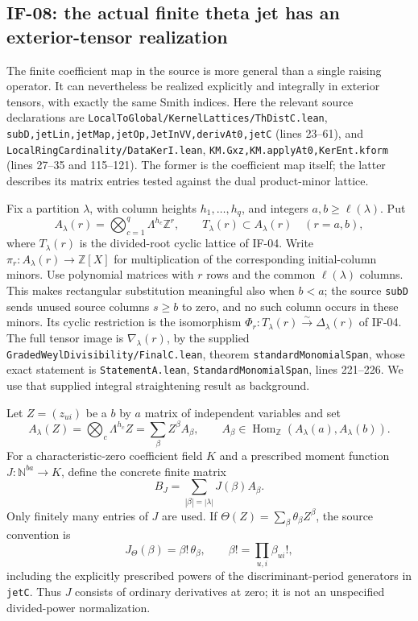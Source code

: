 \subsection{IF-08: the actual finite theta jet has an exterior-tensor realization}
The finite coefficient map in the source is more general than a single
raising operator. It can nevertheless be realized explicitly and
integrally in exterior tensors, with exactly the same Smith indices.
Here the relevant source declarations are
\texttt{LocalToGlobal/KernelLattices/ThDistC.lean},
\texttt{subD,jetLin,jetMap,jetOp,JetInVV,derivAt0,jetC}
(lines 23--61), and
\texttt{LocalRingCardinality/DataKerI.lean},
\texttt{KM.Gxz,KM.applyAt0,KerEnt.kform} (lines 27--35 and 115--121).
The former is the coefficient map itself; the latter describes its
matrix entries tested against the dual product-minor lattice.

Fix a partition $\lambda$, with column heights $h_1,\ldots,h_q$,
and integers $a,b\geq\ell(\lambda)$. Put
\[
 A_\lambda(r)=\bigotimes_{c=1}^q\Lambda^{h_c}\mathbb Z^r,
 \qquad T_\lambda(r)\subset A_\lambda(r)
 \quad (r=a,b),
\]
where $T_\lambda(r)$ is the divided-root cyclic lattice of IF-04.
Write $\pi_r:A_\lambda(r)\longrightarrow\mathbb Z[X]$ for
multiplication of the corresponding initial-column minors. Use polynomial
matrices with $r$ rows and the common $\ell(\lambda)$ columns. This
makes rectangular substitution meaningful also when $b<a$; the
source \texttt{subD} sends unused source columns $s\geq b$ to zero,
and no such column occurs in these minors. Its cyclic
restriction is the isomorphism
$\Phi_r:T_\lambda(r)\xrightarrow\sim\Delta_\lambda(r)$ of IF-04.
The full tensor image is $\nabla_\lambda(r)$, by the supplied
\texttt{GradedWeylDivisibility/FinalC.lean}, theorem
\texttt{standardMonomialSpan}, whose exact statement is
\texttt{StatementA.lean}, \texttt{StandardMonomialSpan}, lines 221--226.
We use that supplied integral straightening result as background.

Let $Z=(z_{ui})$ be a $b$ by $a$ matrix of independent variables and set
\[
 A_\lambda(Z)=\bigotimes_c\Lambda^{h_c}Z
       =\sum_\beta Z^\beta A_\beta,
 \qquad A_\beta\in\operatorname{Hom}_{\mathbb Z}
       (A_\lambda(a),A_\lambda(b)).
\]
For a characteristic-zero coefficient field $K$ and a prescribed moment
function $J:\mathbb N^{ba}\to K$, define the concrete finite matrix
\[
 B_J=\sum_{|\beta|=|\lambda|}J(\beta)A_\beta.       \tag{IF-08a}
\]
Only finitely many entries of $J$ are used. If
$\Theta(Z)=\sum_\beta\theta_\beta Z^\beta$, the source convention is
\[
 J_\Theta(\beta)=\beta!\,\theta_\beta,
 \qquad \beta!=\prod_{u,i}\beta_{ui}!,              \tag{IF-08b}
\]
including the explicitly prescribed powers of the discriminant-period
generators in \texttt{jetC}. Thus $J$ consists of ordinary derivatives
at zero; it is not an unspecified divided-power normalization.

